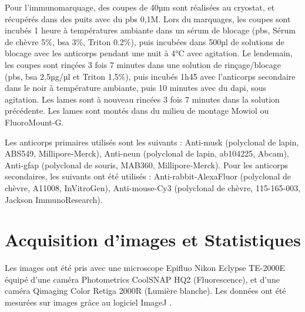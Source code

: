 	Pour l'immunomarquage, des coupes de 40µm sont réalisées au cryostat, et récupérés dans des puits avec du \gls{pbs} 0,1M. Lors du marquages, les coupes sont incubés 1 heure à températures ambiante dans un sérum de blocage (\gls{pbs}, Sérum de chèvre 5\%, \gls{bsa} 3\%, Triton 0.2\%), puis  incubées dans 500µl de solutions de blocage avec les anticorps pendant une nuit à 4°C avec agitation. Le lendemain, les coupes sont rinçées 3 fois 7 minutes dans une solution de rinçage/blocage (\gls{pbs}, \gls{bsa} 2,5µg/µl et Triton 1,5\%), puis incubés 1h45 avec l'anticorps secondaire dans le noir à température ambiante, puis 10 minutes avec du \gls{dapi}, sous agitation. Les lames sont à nouveau rincées 3 fois 7 minutes dans la solution précédente. Les lames sont montés dans du milieu de montage Mowiol ou FluoroMount-G.
	
	Les anticorps primaires utilisés sont les suivants : Anti-\acrshort{musk} (polyclonal de lapin, ABS549, Millipore-Merck),  Anti-\acrshort{neun} (polyclonal de lapin, ab104225, Abcam), Anti-\acrshort{gfap} (polyclonal de souris, MAB360, Millipore-Merck). Pour les anticorps secondaires, les suivants ont été utilisés : Anti-rabbit-AlexaFluor (polyclonal de chèvre, A11008, InVitroGen), Anti-mouse-Cy3 (polyclonal de chèvre, 115-165-003, Jackson ImmunoResearch).
	
\section{Acquisition d'images et Statistiques}
\label{sec:ImagesStats}
	Les images ont été pris avec une microscope Epifluo Nikon Eclypse TE-2000E équipé d'une caméra Photometrics CoolSNAP HQ2 (Fluorescence), et d'une caméra Qimaging Color Retiga 2000R (Lumière blanche).
	Les données ont été mesurées sur images grâce au logiciel ImageJ \cite{Schneider2012}.